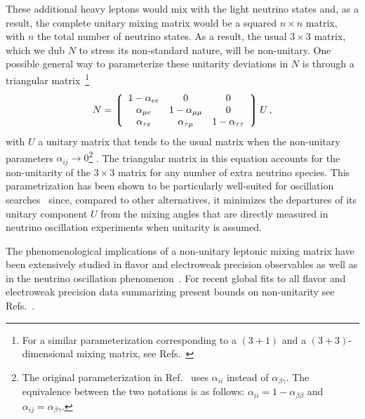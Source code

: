 These additional heavy leptons would mix with the light neutrino
states and, as a result, the complete unitary mixing matrix would be 
a
squared $n \times n$ matrix, with $n$ the total number of neutrino
states. As a result, the usual $3 \times 3$  matrix, which we dub $N$ to stress its non-standard nature, will be
non-unitary. One %
possible general way to parameterize these unitarity deviations in $N$ is through a triangular matrix~\cite{Escrihuela:2015wra}\footnote{For a similar parameterization corresponding to a $(3+1)$ and a $(3+3)$-dimensional mixing matrix,  see Refs.~\cite{Xing:2007zj,Xing:2011ur}}
 \begin{equation}
  N = 
 \left\lgroup
 \begin{array}{ccc} 
 1-\alpha_{ee} & 0 & 0 \\
 \alpha_{\mu e} & 1-\alpha_{\mu \mu} & 0 \\
  \alpha_{\tau e} & \alpha_{\tau \mu} & 1-\alpha_{\tau \tau}
 \end{array}
 \right \rgroup U \,,
 \label{eq:triangular}
 \end{equation}
with $U$ a unitary matrix that tends to the usual  matrix when the non-unitary parameters $\alpha_{ij} \rightarrow 0$\footnote{The original parameterization in Ref.~\cite{Escrihuela:2015wra} uses $\alpha_{ii}$ instead of $\alpha_{\beta\gamma}$. The equivalence between the two notations is as follows: $\alpha_{ii} = 1-\alpha_{\beta\beta}$ and $\alpha_{ij} = \alpha_{\beta\gamma}$.} .
%
 The triangular
matrix in this equation accounts for the non-unitarity of the $3 \times 3$ matrix for any number of extra neutrino species. This parametrization has been shown to be particularly well-suited for oscillation searches~\cite{Escrihuela:2015wra,Blennow:2016jkn} since, compared to other alternatives, it minimizes the departures of its unitary component $U$ from the mixing angles that are directly measured in neutrino oscillation experiments when unitarity is assumed.

The phenomenological implications of a non-unitary leptonic mixing matrix have been extensively studied in flavor and electroweak precision observables as well as in the neutrino oscillation phenomenon~\cite{Shrock:1980vy,Schechter:1980gr,Shrock:1980ct,Shrock:1981wq,Langacker:1988ur,Bilenky:1992wv,Nardi:1994iv,Tommasini:1995ii,Antusch:2006vwa,FernandezMartinez:2007ms,Antusch:2008tz,Biggio:2008in,Antusch:2009pm,Forero:2011pc,Alonso:2012ji,Antusch:2014woa,Abada:2015trh,Fernandez-Martinez:2015hxa,Escrihuela:2015wra,Parke:2015goa,Miranda:2016wdr,Fong:2016yyh,Escrihuela:2016ube}. For recent global fits to all flavor and electroweak precision data summarizing present bounds on non-unitarity see Refs.~\cite{Antusch:2014woa,Fernandez-Martinez:2016lgt}. 

